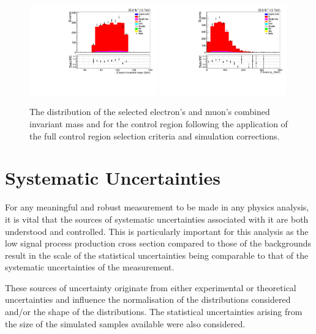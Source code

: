 \begin{figure}[h]
\centering
\includegraphics[width=0.49\textwidth]{figs/background-estimation/plots/unblinded/ttbar_control/zPairMass_SingleTop_wMass_emu.pdf}
\includegraphics[width=0.49\textwidth]{figs/background-estimation/plots/unblinded/ttbar_control/zPairPt_SingleTop_wMass_emu.pdf}
\caption{
The distribution of the selected electron's and muon's combined invariant mass and \pt for the \ttbar control region following the application of the full control region selection criteria and simulation corrections.
}
\label{fig:ttbarCR_leptons}
\end{figure}

\clearpage
\newpage
\section{Systematic Uncertainties}\label{sec:systematics}
For any meaningful and robust measurement to be made in any physics analysis, it is vital that the sources of systematic uncertainties associated with it are both understood and controlled.
This is particularly important for this analysis as the low signal process production cross section compared to those of the backgrounds result in the scale of the statistical uncertainties being comparable to that of the systematic uncertainties of the measurement.

These sources of uncertainty originate from either experimental or theoretical uncertainties and influence the normalisation of the distributions considered and/or the shape of the distributions.
The statistical uncertainties arising from the size of the simulated samples available were also considered.


